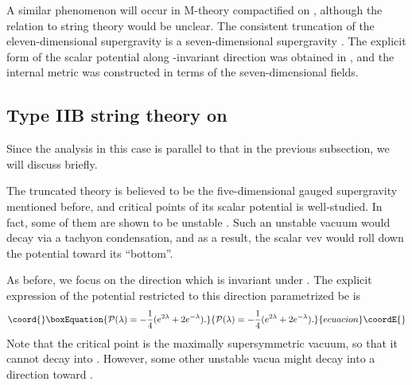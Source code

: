 \documentclass[a4paper,a4paper]{article}
\begin{document}
\vspace{3mm}

A similar phenomenon will occur in M-theory compactified on \coordHE{}, although the relation to string theory would 
be unclear. 
The consistent truncation of the eleven-dimensional supergravity is a seven-dimensional supergravity \cite{7dim}. 
The explicit form of the scalar potential along \coordHE{}-invariant direction was obtained in 
\cite{7dimpotential}, and 
the internal metric was constructed \cite{embed7dim} in terms of the seven-dimensional fields. 




















\vspace{1cm}

\subsection{Type IIB string theory on \coordHE{}}

\vspace{5mm}

Since the analysis in this case is parallel to that in the previous subsection, we will discuss briefly. 

The truncated theory is believed to be the five-dimensional gauged supergravity mentioned before, 
and critical points of its 
scalar potential is 
well-studied. 
In fact, some of them are shown to be unstable \cite{critical1}\cite{critical3}. 
Such an unstable vacuum would decay via a tachyon condensation, and as a result, the scalar vev would roll 
down the potential toward its ``bottom''. 

As before, we focus on the direction which is invariant under \coordHE{}. 
The explicit expression of the potential restricted to this direction parametrized be \myHighlight{$\lambda$}\coordHE{} is \cite{5dim1} 
\begin{equation}\coord{}\boxEquation{
{\cal P}(\lambda) = -\frac14(e^{2\lambda}+2e^{-\lambda}). 
}{
{\cal P}(\lambda) = -\frac14(e^{2\lambda}+2e^{-\lambda}). 
}{ecuacion}\coordE{}\end{equation}
Note that the critical point \coordHE{} is the maximally supersymmetric vacuum, so that it cannot decay into 
\myHighlight{$|\lambda|\to\infty$}\coordHE{}. 
However, some other unstable vacua might decay into a direction toward \myHighlight{$|\lambda|\to\infty$}\coordHE{}. 
\end{document}
